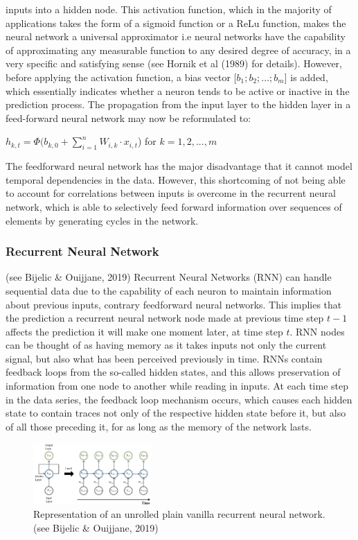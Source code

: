 \documentclass[a4paper,11pt,oneside]{book}
\begin{document}
inputs into a hidden node. This activation function, which in the majority of
applications takes the form of a sigmoid function or a ReLu function, makes the neural network a universal approximator i.e neural networks have the capability of approximating
any measurable function to any desired degree
of accuracy, in a very specific and satisfying
sense (see Hornik et al (1989) for details). However, before applying
the activation function, a bias vector [$b_{1};b_{2};...;b_{m}$] is added, which essentially
indicates whether a neuron tends to be active or inactive in the prediction process. The
propagation from the input layer to the hidden layer in a feed-forward neural
network may now be reformulated to:
 \begin{center}
	$h_{k,t} =\Phi(b_{k,0} +\sum_{i=1}^{n} W_{i,k} \cdot x_{i,t}$) for $k = 1,2,...,m$
\end{center}
The feedforward neural network has the major disadvantage that it cannot model temporal dependencies in the data. However, this shortcoming of not being able to account for correlations between inputs is overcome in the recurrent neural network, which is able to selectively feed forward information over sequences of elements by generating cycles in the network.
\subsubsection{Recurrent Neural Network} (see Bijelic \& Ouijjane, 2019)
Recurrent Neural Networks
(RNN) can handle sequential data due to the capability of each neuron to
maintain information about previous inputs, contrary feedforward neural networks. This implies that the prediction a recurrent
neural network node made at previous time step $t-1$ affects the prediction it will make one
moment later, at time step $t$. RNN nodes can be thought of as having memory as it takes inputs not only the current signal, but also
what has been perceived previously in time.\newline
RNNs contain feedback loops from the so-called hidden states, and this allows preservation of information from one node to another while reading in inputs. At each time step in the data series, the feedback loop mechanism occurs, which causes each hidden state to contain traces not only of the respective hidden state before it, but also of all those preceding it, for as long as the memory of the network lasts.\newline
\begin{figure}[h]
	\centering
	\includegraphics[width=0.4\textwidth]{figures/RNN}
	\caption{Representation of an unrolled plain vanilla recurrent neural network. (see Bijelic \& Ouijjane, 2019)}
	
	\label{seventhfig}
\end{figure}
\end{document}
